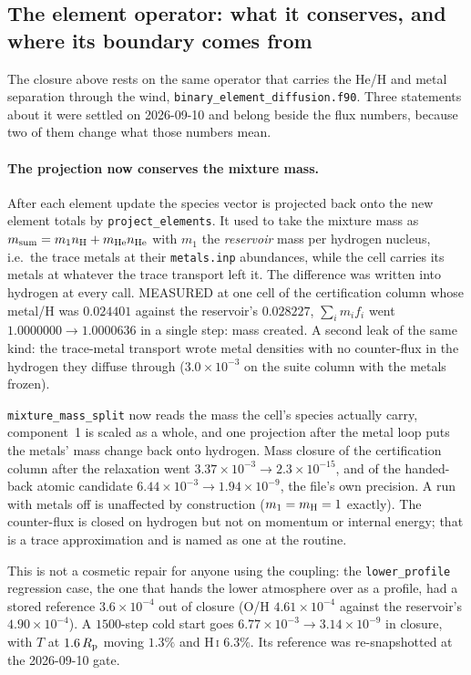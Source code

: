\documentclass[english,a4paper]{my_memo}
\begin{document}
\subsection{The element operator: what it conserves, and where its
boundary comes from}
\label{sub:elemop}

The closure above rests on the same operator that carries the He/H and metal
separation through the wind, \texttt{binary\_element\_diffusion.f90}. Three
statements about it were settled on 2026-09-10 and belong beside the flux
numbers, because two of them change what those numbers mean.

\paragraph{The projection now conserves the mixture mass.} After each
element update the species vector is projected back onto the new element
totals by \texttt{project\_elements}. It used to take the mixture mass as
$m_{\rm sum} = m_1 n_{\rm H} + m_{\rm He} n_{\rm He}$ with $m_1$ the
\emph{reservoir} mass per hydrogen nucleus, i.e.\ the trace metals at their
\texttt{metals.inp} abundances, while the cell carries its metals at whatever
the trace transport left it. The difference was written into hydrogen at
every call. MEASURED at one cell of the certification column whose metal/H
was $0.024401$ against the reservoir's $0.028227$, $\sum_i m_i f_i$ went
$1.0000000 \rightarrow 1.0000636$ in a single step: mass created. A second
leak of the same kind: the trace-metal transport wrote metal densities with no
counter-flux in the hydrogen they diffuse through
($3.0\times10^{-3}$ on the suite column with the metals frozen).

\texttt{mixture\_mass\_split} now reads the mass the cell's species actually
carry, component~1 is scaled as a whole, and one projection after the metal
loop puts the metals' mass change back onto hydrogen. Mass closure of the
certification column after the relaxation went $3.37\times10^{-3} \rightarrow
2.3\times10^{-15}$, and of the handed-back atomic candidate $6.44\times
10^{-3} \rightarrow 1.94\times10^{-9}$, the file's own precision. A run with
metals off is unaffected by construction ($m_1 = m_{\rm H} = 1$ exactly).
The counter-flux is closed on hydrogen but not on momentum or internal
energy; that is a trace approximation and is named as one at the routine.

This is not a cosmetic repair for anyone using the coupling: the
\texttt{lower\_profile} regression case, the one that hands the lower
atmosphere over as a profile, had a stored reference $3.6\times10^{-4}$ out
of closure (O/H $4.61\times10^{-4}$ against the reservoir's
$4.90\times10^{-4}$). A $1500$-step cold start goes $6.77\times10^{-3}
\rightarrow 3.14\times10^{-9}$ in closure, with $T$ at $1.6\,R_{\rm p}$
moving $1.3\%$ and H\,\textsc{i} $6.3\%$. Its reference was re-snapshotted at
the 2026-09-10 gate.
\end{document}
